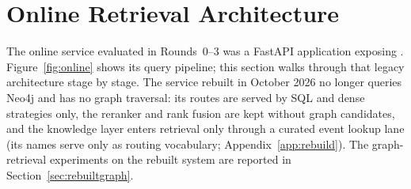 
\section{Online Retrieval Architecture}
\label{sec:retrieval}

The online service evaluated in Rounds~0--3 was a FastAPI application
exposing . Figure~\ref{fig:online} shows its
query pipeline; this section walks through that legacy architecture
stage by stage. The service rebuilt in
October 2026 no longer queries Neo4j and has no graph traversal: its
routes are served by SQL and dense strategies only, the reranker and
rank fusion are kept without graph candidates, and the knowledge layer
enters retrieval only through a curated event lookup lane (its names
serve only as routing vocabulary; Appendix~\ref{app:rebuild}). The graph-retrieval experiments on the
rebuilt system are reported in Section~\ref{sec:rebuiltgraph}.

